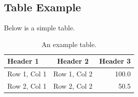\documentclass{article}
\begin{document}
\subsection{Table Example}
Below is a simple table.

\begin{table}[h!]
\centering
\begin{tabular}{|l|c|r|}
\hline
\textbf{Header 1} & \textbf{Header 2} & \textbf{Header 3} \\
\hline
Row 1, Col 1 & Row 1, Col 2 & 100.0 \\
Row 2, Col 1 & Row 2, Col 2 & 50.5 \\
\hline
\end{tabular}
\caption{An example table.}
\label{tab:example}
\end{table}

\lipsum[2]
\end{document}
